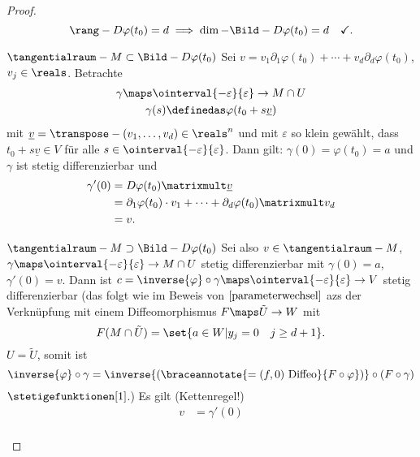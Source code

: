 \begin{proof}
  \begin{equation*}
    \rang-{D\varphi(t_0)=d\implies \dim-{\Bild-{D\varphi(t_0)}}}=d\quad \checkmark.
  \end{equation*}
  \begin{proofdescription}
    \item[\( \tangentialraum-{M}\subset \Bild-{D\varphi(t_0)} \)]
    Sei \( v=v_1\partial_1 \varphi(t_0)+\dotsb+v_d\partial_d \varphi(t_0) \), \( v_j\in \reals \). Betrachte 
    \begin{gather*}
      \gamma\maps \ointerval{-\varepsilon}{\varepsilon}\to M\cap U\\
      \gamma(s)\definedas \varphi(t_0+s\underline{v})
    \end{gather*}
    mit \( \underline{v}=\transpose-{(v_1,\dotsc,v_d)}\in \reals^n \) und mit \( \varepsilon \) so klein gewählt, dass \( t_0+s\underline{v}\in V \) für alle \( s\in \ointerval{-\varepsilon}{\varepsilon} \). Dann gilt: \( \gamma(0)=\varphi(t_0)=a \) und \( \gamma \) ist stetig differenzierbar und
    \begin{align*}
      \gamma'(0)&=D\varphi(t_0)\matrixmult \underline{v}\\
      &=\partial_1 \varphi(t_0)\cdot v_1+\dotsb+\partial_d\varphi(t_0)\matrixmult v_d\\
      &=v.
    \end{align*}
    \item[\( \tangentialraum-{M}\supset \Bild-{D\varphi(t_0)} \)] Sei also \( v\in \tangentialraum-{M} \), \( \gamma\maps \ointerval{-\varepsilon}{\varepsilon}\to M\cap U \) stetig differenzierbar mit \( \gamma(0)=a \), \( \gamma'(0)=v \). Dann ist \( c=\inverse{\varphi}\circ \gamma\maps \ointerval{-\varepsilon}{\varepsilon}\to V  \) stetig differenzierbar (das folgt wie im Beweis von \( \ref{parameterwechsel} \) azs der Verknüpfung mit einem Diffeomorphismus \( F\maps \tilde{U}\to W \) mit
    \begin{equation*}
      F(M\cap \tilde{U})=\set{a\in W|y_j=0\quad j\geq d+1}.
    \end{equation*} 
    \Obda \( U=\tilde{U} \), somit ist
    \begin{equation*}
      \inverse{\varphi}\circ \gamma=\inverse{(\braceannotate{=(f,0)\text{\ Diffeo}}{F\circ \varphi})}\circ (F\circ \gamma)
    \end{equation*}
    \( \stetigefunktionen[1] \).) Es gilt (Kettenregel!)
    \begin{align*}
      v&=\gamma'(0)\\

\end{align*}
\end{proofdescription}
\end{proof}
